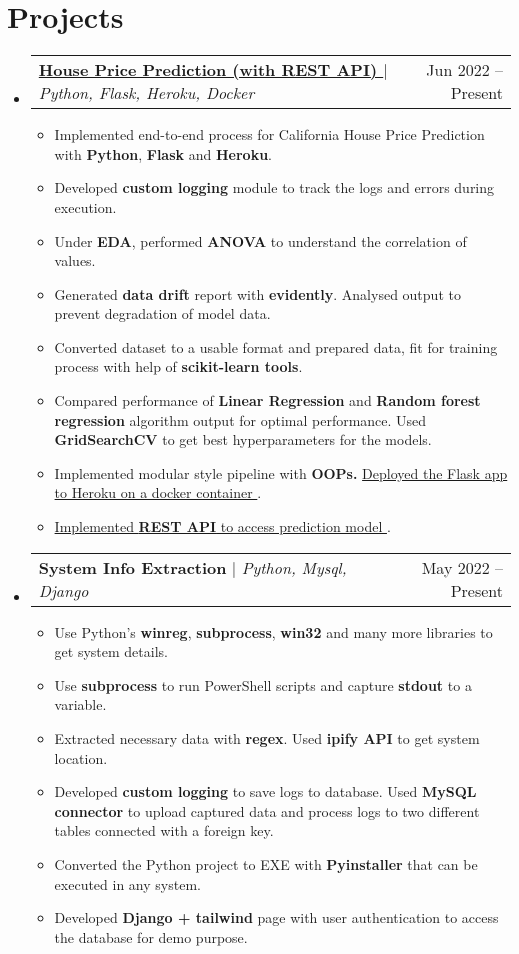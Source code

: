 \documentclass[letterpaper,11pt]{article}
\makeatletter
\newcommand{\resumeItem}[1]{
  \item\small{
    {#1 \vspace{-2pt}}
  }
}
\newcommand{\resumeProjectHeading}[2]{
    \item
    \begin{tabular*}{0.97\textwidth}{l@{\extracolsep{\fill}}r}
      \small#1 & #2 \\
    \end{tabular*}\vspace{-7pt}
}
\newcommand{\resumeSubHeadingListStart}{\begin{itemize}[leftmargin=0.15in, label={}]}
\newcommand{\resumeSubHeadingListEnd}{\end{itemize}}
\newcommand{\resumeItemListStart}{\begin{itemize}}
\newcommand{\resumeItemListEnd}{\end{itemize}\vspace{-5pt}}
\makeatother
\begin{document}
\section{Projects}
    \resumeSubHeadingListStart
      \resumeProjectHeading
          {\textbf{\href{https://github.com/bheemaguli/House-Price-Prediction}{House Price Prediction (with REST API) {\tiny \faLink}}} $|$ \emph{Python, Flask, Heroku, Docker}}{Jun 2022 -- Present}
          \resumeItemListStart
            \resumeItem{Implemented end-to-end process for California House Price Prediction with {\bfseries{Python}}, {\bfseries{Flask}} and {\bfseries{Heroku}}.}
            \resumeItem{Developed {\bfseries{custom logging}} module to track the logs and errors during execution.}
            \resumeItem{Under {\bfseries{EDA}}, performed {\bfseries{ANOVA}} to understand the correlation of values.}
            \resumeItem{Generated {\bfseries{data drift}} report with {\bfseries{evidently}}. Analysed output to prevent degradation of model data.}
            \resumeItem{Converted dataset to a usable format and prepared data, fit for training process with help of {\bfseries{scikit-learn tools}}.}
            \resumeItem{Compared performance of {\bfseries{Linear Regression}} and {\bfseries{Random forest regression}} algorithm output for optimal performance. Used {\bfseries{GridSearchCV}} to get best hyperparameters for the models.}
            \resumeItem{{Implemented modular style pipeline with \bfseries{OOPs}. }\href{https://house-price-prediction-bhem.herokuapp.com/}{Deployed the Flask app to Heroku on a docker container {\tiny \faLink}}.}
            \resumeItem{\href{https://house-price-prediction-bhem.herokuapp.com/docs/api}{Implemented {\bfseries{REST API}} to access prediction model {\tiny \faLink}}.}
          \resumeItemListEnd
      \resumeProjectHeading
          {\textbf{System Info Extraction} $|$ \emph{Python, Mysql, Django}}{May 2022 -- Present}
          \resumeItemListStart
            \vspace{4pt}
            \begin{adjustwidth*}{-0.5cm}{-0.5cm}{Client: Dubai based Large Commodity Trading Company}\vspace{-2pt}\end{adjustwidth*}
            \resumeItem{Use Python's {\bfseries{winreg}}, {\bfseries{subprocess}}, {\bfseries{win32}} and many more libraries to get system details.}
            \resumeItem{Use {\bfseries{subprocess}} to run PowerShell scripts and capture {\bfseries{stdout}} to a variable.}
            \resumeItem{Extracted necessary data with {\bfseries{regex}}. Used {\bfseries{ipify API}} to get system location.}
            \resumeItem{Developed {\bfseries{custom logging}} to save logs to database. Used {\bfseries{MySQL connector}} to upload captured data and process logs to two different tables connected with a foreign key.}
            \resumeItem{Converted the Python project to EXE with {\bfseries{Pyinstaller}} that can be executed in any system.}
            \resumeItem{Developed {\bfseries{Django + tailwind}} page with user authentication to access the database for demo purpose.}
          \resumeItemListEnd
    \resumeSubHeadingListEnd
\end{document}
